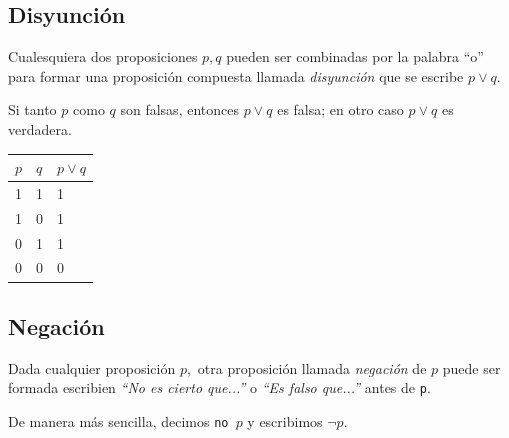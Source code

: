 \subsection{Disyunción}


    Cualesquiera dos proposiciones $p,q$ pueden ser combinadas por la palabra ``o'' para formar una proposición compuesta llamada \emph{disyunción} que se escribe $p \vee q .$



    \begin{definicion}
        Si tanto $p$ como $q$ son falsas, entonces $p \vee q$ es falsa; en otro caso $p\vee q$ es verdadera.

    \end{definicion}

	\begin{tdv}[disyunción] \hfill
		\label{tdv:or}
		\begin{center}
			\begin{tabular}{|l|l|l|}\hline
				$p$ & $q$ & $p \vee q$\\\hline
				1 & 1 & 1\\\hline
				1 & 0 & 1\\\hline
				0 & 1 & 1\\\hline
				0 & 0 & 0\\\hline
			\end{tabular}
		\end{center}

	\end{tdv}




\subsection{Negación}


 Dada cualquier proposición $p,$ otra proposición llamada \emph{negación} de $p$ puede ser formada escribien \emph{``No es cierto que...''} o \emph{``Es falso que...''} antes de \texttt{p}.

 De manera más sencilla, decimos \texttt{no $p$} y escribimos $\neg p.$

